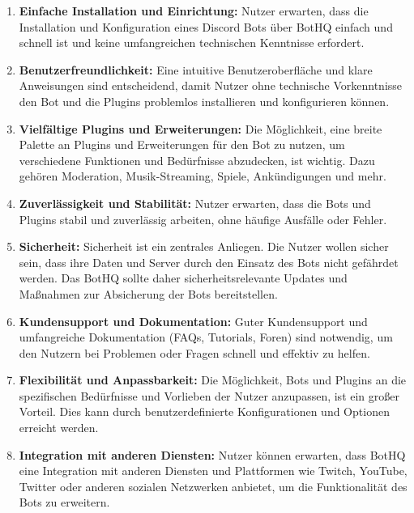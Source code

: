 \begin{enumerate}
  \item \textbf{Einfache Installation und Einrichtung:}
  Nutzer erwarten, dass die Installation und Konfiguration eines Discord Bots über BotHQ einfach und schnell ist und keine umfangreichen technischen Kenntnisse erfordert.

  \item \textbf{Benutzerfreundlichkeit:}
  Eine intuitive Benutzeroberfläche und klare Anweisungen sind entscheidend, damit Nutzer ohne technische Vorkenntnisse den Bot und die Plugins problemlos installieren und konfigurieren können.

  \item \textbf{Vielfältige Plugins und Erweiterungen:}
  Die Möglichkeit, eine breite Palette an Plugins und Erweiterungen für den Bot zu nutzen, um verschiedene Funktionen und Bedürfnisse abzudecken, ist wichtig. Dazu gehören Moderation, Musik-Streaming, Spiele, Ankündigungen und mehr.

  \item \textbf{Zuverlässigkeit und Stabilität:}
  Nutzer erwarten, dass die Bots und Plugins stabil und zuverlässig arbeiten, ohne häufige Ausfälle oder Fehler.

  \item \textbf{Sicherheit:}
  Sicherheit ist ein zentrales Anliegen. Die Nutzer wollen sicher sein, dass ihre Daten und Server durch den Einsatz des Bots nicht gefährdet werden. Das BotHQ sollte daher sicherheitsrelevante Updates und Maßnahmen zur Absicherung der Bots bereitstellen.

  \item \textbf{Kundensupport und Dokumentation:}
  Guter Kundensupport und umfangreiche Dokumentation (FAQs, Tutorials, Foren) sind notwendig, um den Nutzern bei Problemen oder Fragen schnell und effektiv zu helfen.

  \item \textbf{Flexibilität und Anpassbarkeit:}
  Die Möglichkeit, Bots und Plugins an die spezifischen Bedürfnisse und Vorlieben der Nutzer anzupassen, ist ein großer Vorteil. Dies kann durch benutzerdefinierte Konfigurationen und Optionen erreicht werden.

  \item \textbf{Integration mit anderen Diensten:}
  Nutzer können erwarten, dass BotHQ eine Integration mit anderen Diensten und Plattformen wie Twitch, YouTube, Twitter oder anderen sozialen Netzwerken anbietet, um die Funktionalität des Bots zu erweitern.
\end{enumerate}

